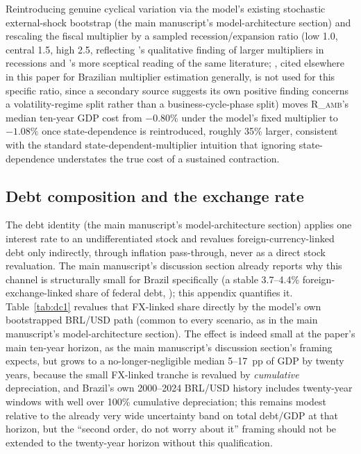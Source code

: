 \documentclass[11pt,a4paper]{article}
\begin{document}
Reintroducing genuine cyclical variation via the model's existing stochastic external-shock bootstrap (the main manuscript's model-architecture section) and rescaling the fiscal multiplier by a sampled recession/expansion ratio (low 1.0, central 1.5, high 2.5, reflecting \citet{auerbachgorodnichenko2012}'s qualitative finding of larger multipliers in recessions and \citet{ramey2019,rameyzubairy2018}'s more sceptical reading of the same literature; \citet{pires2014}, cited elsewhere in this paper for Brazilian multiplier estimation generally, is not used for this specific ratio, since a secondary source suggests its own positive finding concerns a volatility-regime split rather than a business-cycle-phase split) moves \textsc{R\_amb}'s median ten-year GDP cost from $-0.80\%$ under the model's fixed multiplier to $-1.08\%$ once state-dependence is reintroduced, roughly 35\% larger, consistent with the standard state-dependent-multiplier intuition that ignoring state-dependence understates the true cost of a sustained contraction.

\subsection{Debt composition and the exchange rate}

The debt identity (the main manuscript's model-architecture section) applies one interest rate to an undifferentiated stock and revalues foreign-currency-linked debt only indirectly, through inflation pass-through, never as a direct stock revaluation. The main manuscript's discussion section already reports why this channel is structurally small for Brazil specifically (a stable 3.7--4.4\% foreign-exchange-linked share of federal debt, \citealp{tesourormd2026}); this appendix quantifies it. Table~\ref{tab:dc1} revalues that FX-linked share directly by the model's own bootstrapped BRL/USD path (common to every scenario, as in the main manuscript's model-architecture section). The effect is indeed small at the paper's main ten-year horizon, as the main manuscript's discussion section's framing expects, but grows to a no-longer-negligible median 5--17~pp of GDP by twenty years, because the small FX-linked tranche is revalued by \emph{cumulative} depreciation, and Brazil's own 2000--2024 BRL/USD history includes twenty-year windows with well over 100\% cumulative depreciation; this remains modest relative to the already very wide uncertainty band on total debt/GDP at that horizon, but the ``second order, do not worry about it'' framing should not be extended to the twenty-year horizon without this qualification.
\end{document}
